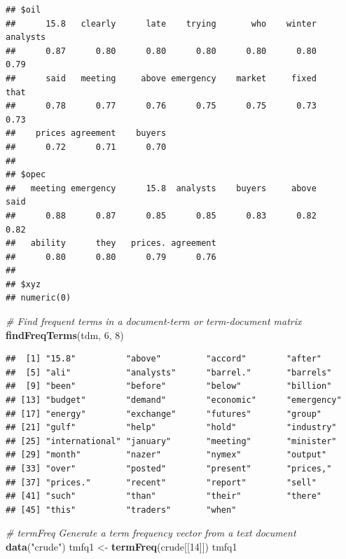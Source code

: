 \documentclass[]{book}
\newenvironment{Shaded}{\begin{snugshade}}{\end{snugshade}}
\newcommand{\KeywordTok}[1]{\textcolor[rgb]{0.13,0.29,0.53}{\textbf{{#1}}}}
\newcommand{\DecValTok}[1]{\textcolor[rgb]{0.00,0.00,0.81}{{#1}}}
\newcommand{\StringTok}[1]{\textcolor[rgb]{0.31,0.60,0.02}{{#1}}}
\newcommand{\CommentTok}[1]{\textcolor[rgb]{0.56,0.35,0.01}{\textit{{#1}}}}
\newcommand{\NormalTok}[1]{{#1}}
\begin{document}
\begin{verbatim}
## $oil
##      15.8   clearly      late    trying       who    winter  analysts 
##      0.87      0.80      0.80      0.80      0.80      0.80      0.79 
##      said   meeting     above emergency    market     fixed      that 
##      0.78      0.77      0.76      0.75      0.75      0.73      0.73 
##    prices agreement    buyers 
##      0.72      0.71      0.70 
## 
## $opec
##   meeting emergency      15.8  analysts    buyers     above      said 
##      0.88      0.87      0.85      0.85      0.83      0.82      0.82 
##   ability      they   prices. agreement 
##      0.80      0.80      0.79      0.76 
## 
## $xyz
## numeric(0)
\end{verbatim}

\begin{Shaded}
\begin{Highlighting}[]
\CommentTok{# Find frequent terms in a document-term or term-document matrix}
\KeywordTok{findFreqTerms}\NormalTok{(tdm, }\DecValTok{6}\NormalTok{, }\DecValTok{8}\NormalTok{)}
\end{Highlighting}
\end{Shaded}

\begin{verbatim}
##  [1] "15.8"          "above"         "accord"        "after"        
##  [5] "ali"           "analysts"      "barrel."       "barrels"      
##  [9] "been"          "before"        "below"         "billion"      
## [13] "budget"        "demand"        "economic"      "emergency"    
## [17] "energy"        "exchange"      "futures"       "group"        
## [21] "gulf"          "help"          "hold"          "industry"     
## [25] "international" "january"       "meeting"       "minister"     
## [29] "month"         "nazer"         "nymex"         "output"       
## [33] "over"          "posted"        "present"       "prices,"      
## [37] "prices."       "recent"        "report"        "sell"         
## [41] "such"          "than"          "their"         "there"        
## [45] "this"          "traders"       "when"
\end{verbatim}

\begin{Shaded}
\begin{Highlighting}[]
\CommentTok{# termFreq   Generate a term frequency vector from a text document}
\KeywordTok{data}\NormalTok{(}\StringTok{"crude"}\NormalTok{)}
\NormalTok{tmfq1 <-}\StringTok{ }\KeywordTok{termFreq}\NormalTok{(crude[[}\DecValTok{14}\NormalTok{]])}
\NormalTok{tmfq1}
\end{Highlighting}
\end{Shaded}
\end{document}

